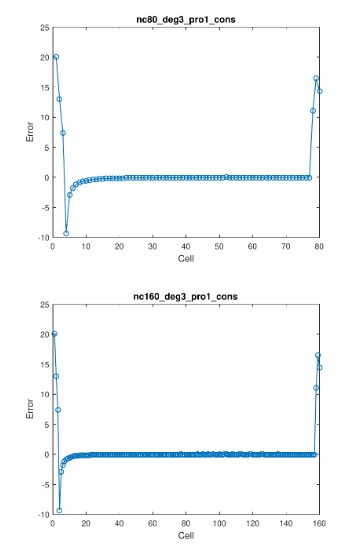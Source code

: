 \documentclass[11pt,a4paper]{article}
\theoremstyle{plain}
\theoremstyle{definition}
\begin{document}
\begin{figure}[H]
\medskip
\begin{subfigure}[b]{0.48\textwidth}
\includegraphics[width=\linewidth]{../../tests_01_01/test_01_01_test48_pro1_cons/output/plots/nc80_deg3_wei111_pro1_cons.pdf}
\end{subfigure}\hspace*{\fill}
\begin{subfigure}[b]{0.48\textwidth}
\includegraphics[width=\linewidth]{../../tests_01_01/test_01_01_test48_pro1_cons/output/plots/nc160_deg3_wei111_pro1_cons.pdf}
\end{subfigure}


\end{figure}
\end{document}
